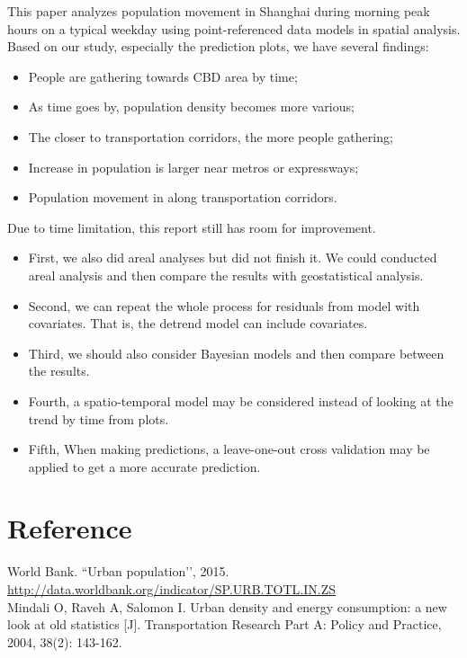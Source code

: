 \documentclass[hidelinks,12pt]{article}
\begin{document}
	This paper analyzes population movement in Shanghai during morning peak hours on a typical weekday using point-referenced data models in spatial analysis. Based on our study, especially the prediction plots, we have several findings:
	\begin{itemize}
		\item People are gathering towards CBD area by time;
		\item As time goes by, population density becomes more various;
		\item The closer to transportation corridors, the more people gathering;
		\item Increase in population is larger near metros or expressways;
		\item Population movement in along transportation corridors.
	\end{itemize}

	Due to time limitation, this report still has room for improvement.
	\begin{itemize}
		\item First, we also did areal analyses but did not finish it. We could conducted areal analysis and then compare the results with geostatistical analysis.
		\item Second, we can repeat the whole process for residuals from model with covariates. That is, the detrend model can include covariates.
		\item Third, we should also consider Bayesian models and then compare between the results.
		\item Fourth, a spatio-temporal model may be considered instead of looking at the trend by time from plots.
		\item Fifth, When making predictions, a leave-one-out cross validation may be applied to get a more accurate prediction.
	\end{itemize}
	
	\section{Reference}\label{sec:ref}
	\noindent World Bank. “Urban population’’, 2015.\\
	\url{http://data.worldbank.org/indicator/SP.URB.TOTL.IN.ZS}\\
	
	\noindent Mindali O, Raveh A, Salomon I. Urban density and energy consumption: a new look at old statistics [J]. Transportation Research Part A: Policy and Practice, 2004, 38(2): 143-162.\\
	
\end{document}
